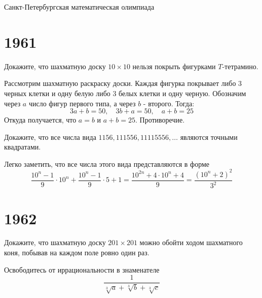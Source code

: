 \documentclass[11pt, a4paper]{common/document_template}
\begin{document}
\begin{titlepage}
  \begin{center}
	\Huge{Санкт-Петербургская математическая олимпиада}
  \end{center}
\end{titlepage} 

\chapter{1961}

\begin{exercise}[21]
Докажите, что шахматную доску $10 \times 10$ нельзя покрыть фигурками $T$-тетрамино.
\end{exercise}

\begin{Solution}
Рассмотрим шахматную раскраску доски. Каждая фигурка покрывает либо 3 черных клетки и одну белую либо 3 белых клетки и одну черную.  Обозначим через $a$ число фигур первого типа, а через $b$ - второго. Тогда:
$$
3a + b = 50, \quad 3b + a = 50, \quad a + b = 25
$$
Откуда получается, что $a = b$ и $a + b = 25$. Противоречие.
\end{Solution}

\begin{exercise}[23]
Докажите, что все числа вида $1156, 111556, 11115556, \dots$ являются точными квадратами.
\end{exercise}

\begin{Solution}
Легко заметить, что все числа этого вида представляются в форме
$$
\frac{10^{n}-1}{9} \cdot 10^{n} + \frac{10^{n} - 1}{9} \cdot 5 + 1 = \frac{10^{2n} + 4 \cdot 10^{n} + 4}{9} = \frac{(10^{n} + 2)^{2}}{3^{2}}
$$
\end{Solution}

\chapter{1962}

\begin{exercise}[5]
Докажите, что шахматную доску $201 \times 201$ можно обойти ходом шахматного коня, побывав на каждом поле ровно один раз.
\end{exercise}

\begin{exercise}[32]
Освободитесь от иррациональности в знаменателе
$$
\frac{1}{\sqrt[3]{a} + \sqrt[3]{b} + \sqrt[3]{c}}
$$
\end{exercise}
\end{document}
